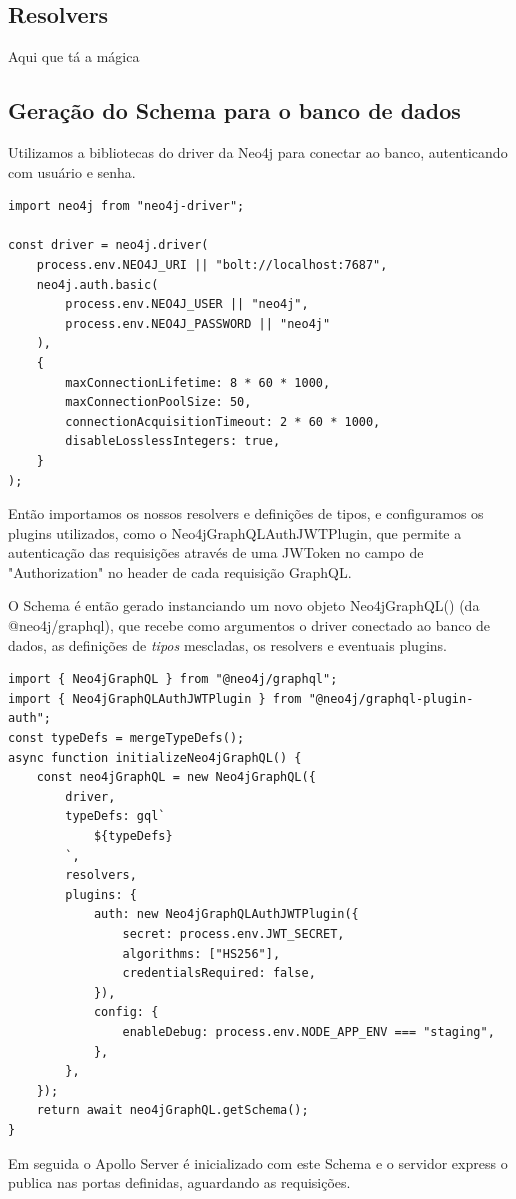 \subsection{Resolvers}

Aqui que tá a mágica 

\subsection{Geração do Schema para o banco de dados}

 Utilizamos a bibliotecas do driver da Neo4j para conectar ao banco, autenticando com usuário e senha.
 
 \begin{lstlisting}
import neo4j from "neo4j-driver";

const driver = neo4j.driver(
	process.env.NEO4J_URI || "bolt://localhost:7687",
	neo4j.auth.basic(
		process.env.NEO4J_USER || "neo4j",
		process.env.NEO4J_PASSWORD || "neo4j"
	),
	{
		maxConnectionLifetime: 8 * 60 * 1000,
		maxConnectionPoolSize: 50,
		connectionAcquisitionTimeout: 2 * 60 * 1000,
		disableLosslessIntegers: true,
	}
);
\end{lstlisting}

Então importamos os nossos resolvers e definições de tipos, e configuramos os plugins utilizados, como o Neo4jGraphQLAuthJWTPlugin, que permite a autenticação das requisições através de uma JWToken no campo de "Authorization" no header de cada requisição GraphQL.

 O Schema é então gerado instanciando um novo objeto Neo4jGraphQL() (da @neo4j/graphql), que recebe como argumentos o driver conectado ao banco de dados, as definições de \textit{tipos} mescladas, os resolvers e eventuais plugins.

\begin{lstlisting}
import { Neo4jGraphQL } from "@neo4j/graphql";
import { Neo4jGraphQLAuthJWTPlugin } from "@neo4j/graphql-plugin-auth";
const typeDefs = mergeTypeDefs();
async function initializeNeo4jGraphQL() {
	const neo4jGraphQL = new Neo4jGraphQL({
		driver,
		typeDefs: gql`
			${typeDefs}
		`,
		resolvers,
		plugins: {
			auth: new Neo4jGraphQLAuthJWTPlugin({
				secret: process.env.JWT_SECRET,
				algorithms: ["HS256"],
				credentialsRequired: false,
			}),
			config: {
				enableDebug: process.env.NODE_APP_ENV === "staging",
			},
		},
	});
	return await neo4jGraphQL.getSchema();
}
\end{lstlisting}

Em seguida o Apollo Server é inicializado com este Schema e o servidor express o publica nas portas definidas, aguardando as requisições.


